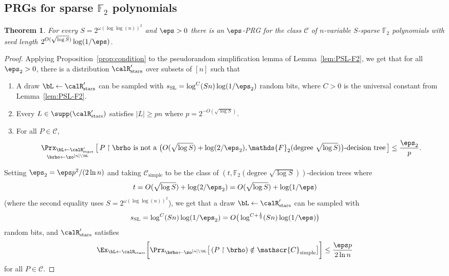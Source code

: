 \documentclass[11pt]{article}
\numberwithin{equation}{section}
\newtheorem{theorem}{Theorem}[section]
\theoremstyle{definition}
\theoremstyle{plain}
\theoremstyle{plain}
\newcommand{\uhr}{\upharpoonright}
\newcommand{\simple}{\mathrm{simple}}
\newcommand{\stars}{\mathrm{stars}}
\newcommand{\SL}{\mathrm{SL}}
\renewcommand{\F}{\mathds{F}}
\begin{document}
\subsection{PRGs for sparse $\F_2$ polynomials} 



\begin{theorem}
For every $S = 2^{\omega(\log \log(n))^2}$ and $\eps > 0$ there is an $\eps$-PRG for the class $\mathscr{C}$ of $n$-variable $S$-sparse $\F_2$ polynomials with seed length $2^{O(\sqrt{\log S})}\log(1/\eps)$. 
\end{theorem} 


\begin{proof} 
Applying Proposition~\ref{prop:condition} to the pseudorandom simplification lemma of Lemma~\ref{lem:PSL-F2}, we get that for all $\eps_2 > 0$, there is a distribution $\calR'_\stars$ over subsets of $[n]$ such that 
\begin{enumerate}
\item A draw $\bL \leftarrow \calR'_\stars$ can be sampled with $s_\SL = \log^C(Sn)\log(1/\eps_2)$ random bits, where $C > 0$ is the universal constant from Lemma~\ref{lem:PSL-F2}.
\item Every $L\in \supp(\calR'_\stars)$ satisfies $|L| \ge pn$ where $p = 2^{-O(\sqrt{\log S})}$. 
\item For all $P \in \mathscr{C}$, 
\[ \mathop{\Prx_{\bL\leftarrow\calR'_\stars}}_{\brho\leftarrow\zo^{[n]\setminus \bL}}\big[\,\text{$P \uhr \brho$ is not a $\big(O(\sqrt{\log S}) +  \log(2/\eps_2), \F_2(\text{degree $\sqrt{\log S}$})\big)$-decision tree}\,\big] \le \frac{\eps_2}{p}. \] 
\end{enumerate}
Setting $\eps_2 = \eps p^2/(2\ln n)$ and taking $\mathscr{C}_\simple$ to be the class of $(t,\F_2(\text{degree $\sqrt{\log S}$}))$-decision trees where 
\[ t = O(\sqrt{\log S}) + \log(2/\eps_2) = O(\sqrt{\log S})  +  \log(1/\eps) \]
(where the second equality uses $S = 2^{\omega(\log \log(n))^2}$),
we get that a draw $\bL \leftarrow\calR'_\stars$ can be sampled with  
\[ s_\SL = \log^C(Sn) \log(1/\eps_2) =  O\big(\log^{C+ \frac1{2}}(Sn)\log(1/\eps)\big)  \]
random bits, and $\calR'_\stars$ satisfies
 \[ \Ex_{\bL\leftarrow\calR_{\stars}}\bigg[ \Prx_{\brho\leftarrow\zo^{[n]\setminus \bL}}\big[\, (P \uhr \brho) \notin \mathscr{C}_\simple\big] \bigg]  \le \frac{\eps p}{2\ln n}\] 
 for all $P \in \mathscr{C}$. 
 

\end{proof}
\end{document}
